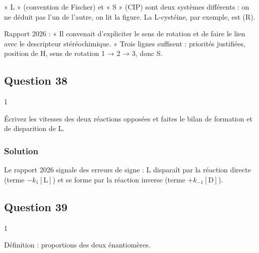 \documentclass[11pt,a4paper]{article}
\newcommand{\equationajustee}[1]{%
  \sbox{\boiteequation}{$\displaystyle #1$}%
  \ifdim\wd\boiteequation>\linewidth
    \[\resizebox{\linewidth}{!}{\usebox{\boiteequation}}\]%
  \else
    \[#1\]%
  \fi}
\begin{document}
\begin{piege}

« L » (convention de Fischer) et « S » (CIP) sont deux systèmes différents : on ne déduit pas l'un de l'autre, on lit la figure. La L-cystéine, par exemple, est (R).

\end{piege}

\begin{jury}

Rapport 2026 : « Il convenait d'expliciter le sens de rotation et de faire le lien avec le descripteur stéréochimique. » Trois lignes suffisent : priorités justifiées, position de H, sens de rotation 1 → 2 → 3, donc S.

\end{jury}

\hypertarget{question-38}{%
\subsection{Question 38}\label{question-38}}

\begin{indication}{1}

Écrivez les vitesses des deux réactions opposées et faites le bilan de formation et de disparition de L.

\end{indication}

\hypertarget{solution-37}{%
\subsubsection{Solution}\label{solution-37}}

\equationajustee{\boxed{\frac{\mathrm d[\mathrm L]}{\mathrm dt}=-k_1[\mathrm L]+k_{-1}[\mathrm D]}}

\begin{piege}

Le rapport 2026 signale des erreurs de signe : L disparaît par la réaction directe (terme \(-k_1[\mathrm L]\)) et se forme par la réaction inverse (terme \(+k_{-1}[\mathrm D]\)).

\end{piege}

\hypertarget{question-39}{%
\subsection{Question 39}\label{question-39}}

\begin{indication}{1}

Définition : proportions des deux énantiomères.

\end{indication}
\end{document}
